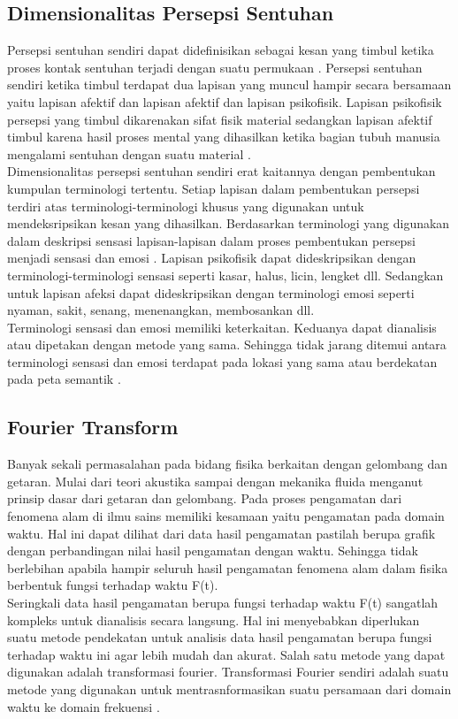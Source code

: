 	\subsection{Dimensionalitas Persepsi Sentuhan}
	\indent Persepsi sentuhan sendiri dapat didefinisikan sebagai kesan yang timbul ketika proses kontak sentuhan terjadi dengan suatu permukaan \cite{Okamoto2013}. Persepsi sentuhan sendiri ketika timbul terdapat dua lapisan yang muncul hampir secara bersamaan yaitu lapisan afektif dan lapisan afektif dan lapisan psikofisik. Lapisan psikofisik persepsi yang timbul dikarenakan sifat fisik material sedangkan lapisan afektif timbul karena hasil proses mental yang dihasilkan ketika bagian tubuh manusia mengalami sentuhan dengan suatu material \cite{Okamoto2013}. \\
	\indent Dimensionalitas persepsi sentuhan sendiri erat kaitannya dengan pembentukan kumpulan terminologi tertentu. Setiap lapisan dalam pembentukan persepsi terdiri atas terminologi-terminologi khusus yang digunakan untuk mendeksripsikan kesan yang dihasilkan. Berdasarkan terminologi yang digunakan dalam deskripsi sensasi lapisan-lapisan dalam proses pembentukan persepsi menjadi sensasi dan emosi \cite{Olausson2016}. Lapisan psikofisik dapat dideskripsikan dengan terminologi-terminologi sensasi seperti kasar, halus, licin, lengket dll. Sedangkan untuk lapisan afeksi dapat dideskripsikan dengan terminologi emosi seperti nyaman, sakit, senang, menenangkan, membosankan dll. \\
	\indent Terminologi sensasi dan emosi memiliki keterkaitan. Keduanya dapat dianalisis atau dipetakan dengan metode yang sama. Sehingga tidak jarang ditemui antara terminologi sensasi dan emosi terdapat pada lokasi yang sama atau berdekatan pada peta semantik \cite{Olausson2016}. 
	
	\subsection{Fourier Transform}
	\indent Banyak sekali permasalahan pada bidang fisika berkaitan dengan gelombang dan getaran. Mulai dari teori akustika sampai dengan mekanika fluida menganut prinsip dasar dari getaran dan gelombang. Pada proses pengamatan dari fenomena alam di ilmu sains memiliki kesamaan yaitu pengamatan pada domain waktu. Hal ini dapat dilihat dari data hasil pengamatan pastilah berupa grafik dengan perbandingan nilai hasil pengamatan dengan waktu. Sehingga tidak berlebihan apabila hampir seluruh hasil pengamatan fenomena alam dalam fisika berbentuk fungsi terhadap waktu F(t).\\
	\indent Seringkali data hasil pengamatan berupa fungsi terhadap waktu F(t) sangatlah kompleks untuk dianalisis secara langsung. Hal ini menyebabkan diperlukan suatu metode pendekatan untuk analisis data hasil pengamatan berupa fungsi terhadap waktu ini agar lebih mudah dan akurat. Salah satu metode yang dapat digunakan adalah transformasi fourier. Transformasi Fourier sendiri adalah suatu metode yang digunakan untuk mentrasnformasikan suatu persamaan dari domain waktu ke domain frekuensi \cite{james1996student}.
	
